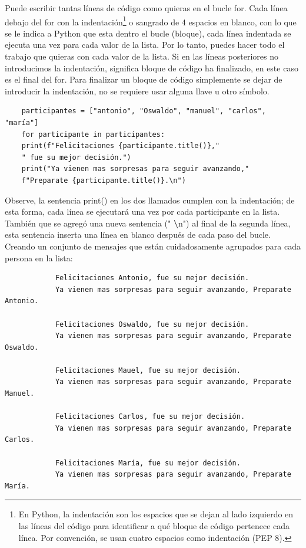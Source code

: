 Puede escribir tantas líneas de código como quieras en el bucle  {\ttfamily for}. Cada  
línea  debajo del  {\ttfamily for} con la indentación\footnote{En Python, la indentación son los espacios que se dejan al lado izquierdo en las líneas del código para identificar a qué bloque de código pertenece cada línea. Por convención, se usan cuatro espacios como indentación  (PEP 8).} o sangrado de 4 espacios en blanco, con lo que se le indica a Python que esta dentro el bucle (bloque),  cada línea indentada se ejecuta una vez para cada valor de la lista. Por lo tanto, puedes hacer todo el trabajo que quieras con cada valor de la lista.
Si en las  líneas posteriores no introducimos la indentación, significa bloque de código ha finalizado, en este caso es el final  del {\ttfamily for}. Para finalizar un bloque de código simplemente se dejar de introducir la indentación, no se requiere usar alguna llave u otro símbolo.

\begin{lstlisting}		
	participantes = ["antonio", "Oswaldo", "manuel", "carlos", "maría"]
	for participante in participantes:
	print(f"Felicitaciones {participante.title()},"
	" fue su mejor decisión.")
	print("Ya vienen mas sorpresas para seguir avanzando,"
	f"Preparate {participante.title()}.\n")	
\end{lstlisting}

Observe, la sentencia {\ttfamily print()} en los dos llamados cumplen con la indentación;  de esta forma,  cada línea se ejecutará una vez por cada participante en la lista. También que se agregó una nueva sentencia ("{}{ \scriptsize {\bf {\textbackslash}}}n{}") al final de la segunda línea, esta sentencia inserta una línea en blanco después de cada paso del bucle. Creando un conjunto de mensajes que están cuidadosamente agrupados para cada persona en la lista:

{\ttfamily\scriptsize\scriptsize 
	\hspace{-0.65cm} \vspace{-0.3cm}	
	{\color{blue} 	
		\begin{verbatim}
			Felicitaciones Antonio, fue su mejor decisión.
			Ya vienen mas sorpresas para seguir avanzando, Preparate Antonio.
			
			Felicitaciones Oswaldo, fue su mejor decisión.
			Ya vienen mas sorpresas para seguir avanzando, Preparate Oswaldo.
			
			Felicitaciones Mauel, fue su mejor decisión.
			Ya vienen mas sorpresas para seguir avanzando, Preparate Manuel.
			
			Felicitaciones Carlos, fue su mejor decisión.
			Ya vienen mas sorpresas para seguir avanzando, Preparate Carlos.
			
			Felicitaciones María, fue su mejor decisión.
			Ya vienen mas sorpresas para seguir avanzando, Preparate María.
		\end{verbatim}
}}

